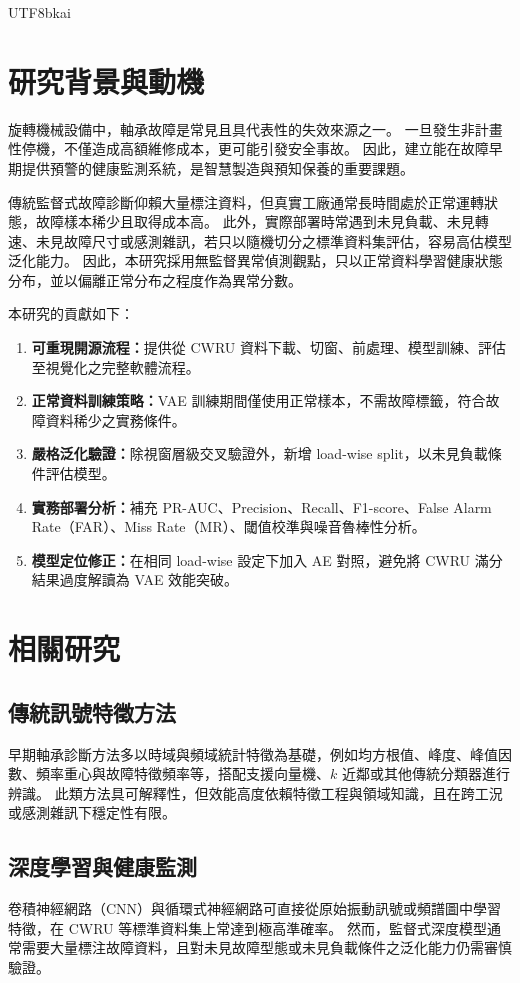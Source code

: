 \documentclass[conference]{IEEEtran}
\begin{document}
\begin{CJK}{UTF8}{bkai}
\section{研究背景與動機}
旋轉機械設備中，軸承故障是常見且具代表性的失效來源之一。
一旦發生非計畫性停機，不僅造成高額維修成本，更可能引發安全事故。
因此，建立能在故障早期提供預警的健康監測系統，是智慧製造與預知保養的重要課題。

傳統監督式故障診斷仰賴大量標注資料，但真實工廠通常長時間處於正常運轉狀態，故障樣本稀少且取得成本高。
此外，實際部署時常遇到未見負載、未見轉速、未見故障尺寸或感測雜訊，若只以隨機切分之標準資料集評估，容易高估模型泛化能力。
因此，本研究採用無監督異常偵測觀點，只以正常資料學習健康狀態分布，並以偏離正常分布之程度作為異常分數。

本研究的貢獻如下：
\begin{enumerate}
  \item \textbf{可重現開源流程：}提供從 CWRU 資料下載、切窗、前處理、模型訓練、評估至視覺化之完整軟體流程。
  \item \textbf{正常資料訓練策略：}VAE 訓練期間僅使用正常樣本，不需故障標籤，符合故障資料稀少之實務條件。
  \item \textbf{嚴格泛化驗證：}除視窗層級交叉驗證外，新增 load-wise split，以未見負載條件評估模型。
  \item \textbf{實務部署分析：}補充 PR-AUC、Precision、Recall、F1-score、False Alarm Rate（FAR）、Miss Rate（MR）、閾值校準與噪音魯棒性分析。
  \item \textbf{模型定位修正：}在相同 load-wise 設定下加入 AE 對照，避免將 CWRU 滿分結果過度解讀為 VAE 效能突破。
\end{enumerate}

\section{相關研究}
\subsection{傳統訊號特徵方法}
早期軸承診斷方法多以時域與頻域統計特徵為基礎，例如均方根值、峰度、峰值因數、頻率重心與故障特徵頻率等，搭配支援向量機、$k$ 近鄰或其他傳統分類器進行辨識\cite{smith2015rolling}。
此類方法具可解釋性，但效能高度依賴特徵工程與領域知識，且在跨工況或感測雜訊下穩定性有限。

\subsection{深度學習與健康監測}
卷積神經網路（CNN）與循環式神經網路可直接從原始振動訊號或頻譜圖中學習特徵，在 CWRU 等標準資料集上常達到極高準確率\cite{zhao2019deep}。
然而，監督式深度模型通常需要大量標注故障資料，且對未見故障型態或未見負載條件之泛化能力仍需審慎驗證。


\end{CJK}
\end{document}
